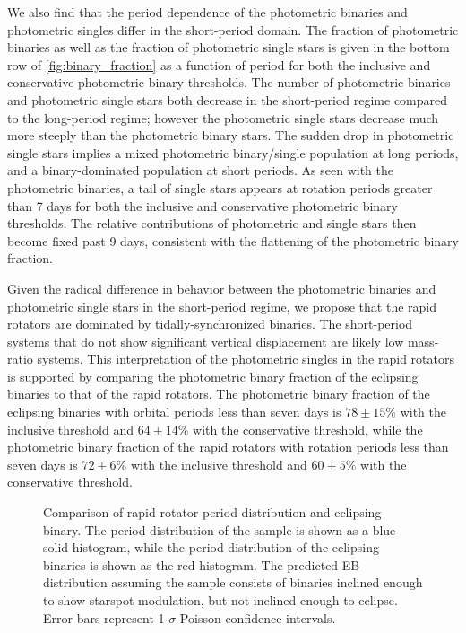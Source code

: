 \documentclass[manuscript]{aastex6}
\begin{document}
We also find that the period dependence of the photometric binaries and
photometric singles differ in the short-period domain. The fraction of
photometric binaries as well as the fraction of
photometric single stars is given in the bottom row of
\cref{fig:binary_fraction} as a function of period for both the inclusive and 
conservative photometric binary thresholds. The number of photometric binaries and 
photometric single stars both decrease in the short-period regime compared to the 
long-period regime; however the photometric single stars decrease much more 
steeply than the photometric binary stars. The sudden drop in photometric 
single stars implies a mixed photometric binary/single population at long 
periods, and a binary-dominated population at short periods. As seen with the
photometric binaries, a tail of 
single stars appears at rotation periods greater than 7 days for both the 
inclusive and conservative photometric binary thresholds. The relative contributions of 
photometric and single stars then become fixed past 9 days, consistent with 
the flattening of the photometric binary fraction. 

Given the radical difference in behavior between the photometric binaries and
photometric single stars in the short-period regime, we propose that the 
rapid rotators are dominated by tidally-synchronized binaries. The 
short-period systems that do not show significant vertical displacement are 
likely low mass-ratio systems. This interpretation of the photometric singles 
in the rapid rotators is supported by comparing the photometric binary 
fraction of the eclipsing binaries to that of the rapid rotators. The 
photometric binary fraction of the eclipsing binaries with orbital periods 
less than seven days is \(78 \pm 15\%\) with the inclusive threshold and 
\(64 \pm 14\%\) with the conservative threshold, while the photometric 
binary fraction of the rapid rotators with rotation periods less than seven 
days is \(72 \pm 6\%\) with the inclusive threshold and \(60 \pm 5\%\) with 
the conservative threshold.  

\begin{figure}[htb]
    \centering
    \caption{Comparison of rapid rotator period distribution and eclipsing
    binary. The period distribution of the \citet{McQuillan14} sample is shown
as a blue solid histogram, while the period distribution of the eclipsing binaries
is shown as the red histogram. The predicted EB distribution assuming the
\citet{McQuillan14} sample consists of binaries inclined enough to show
starspot modulation, but not inclined enough to eclipse. Error bars represent
1-\(\sigma\) Poisson confidence intervals.}\label{fig:eclipseprob}
\end{figure}
\end{document}

